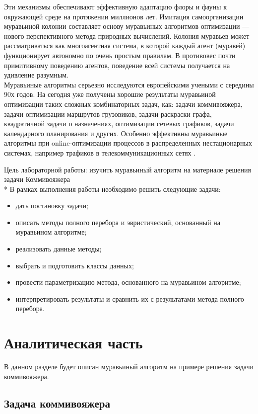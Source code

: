 \documentclass[12pt, a4paper]{report}
\begin{document}
	Эти механизмы обеспечивают эффективную адаптацию флоры и фауны к окружающей среде на протяжении миллионов лет. Имитация самоорганизации муравьиной колонии составляет основу муравьиных алгоритмов оптимизации — нового перспективного метода природных вычислений. Колония муравьев может рассматриваться как многоагентная система, в которой каждый агент (муравей) функционирует автономно по очень простым правилам. В противовес почти примитивному поведению агентов, поведение всей системы получается на удивление разумным.\\
	
	Муравьиные алгоритмы серьезно исследуются европейскими учеными с середины 90х годов. На сегодня уже получены хорошие результаты муравьиной оптимизации таких сложных комбинаторных задач, как: задачи коммивояжера, задачи оптимизации маршрутов грузовиков, задачи раскраски графа, квадратичной задачи о назначениях, оптимизации сетевых графиков, задачи календарного планирования и других. Особенно эффективны муравьиные алгоритмы при online-оптимизации процессов в распределенных нестационарных системах, например трафиков в телекоммуникационных сетях \cite{shtovba}.
	
	Цель лабораторной работы: изучить муравьиный алгоритм на материале решения задачи Коммивояжера \\*
	В рамках выполнения работы необходимо решить следующие задачи:
	\begin{itemize}
		\item дать постановку задачи;
		\item описать методы полного перебора и эвристический, основанный на муравьином алгоритме;
		\item реализовать данные методы;
		\item выбрать и подготовить классы данных;
		\item провести параметризацию метода, основанного на муравьином алгоритме;
		\item интерпретировать результаты и сравнить их с результатами метода полного перебора.
	\end{itemize}
	
	\newpage
	
	\chapter{Аналитическая часть}
	
	В данном разделе будет описан муравьиный алгоритм на примере решения задачи коммивояжера.

	\section{Задача коммивояжера}
	
\end{document}
